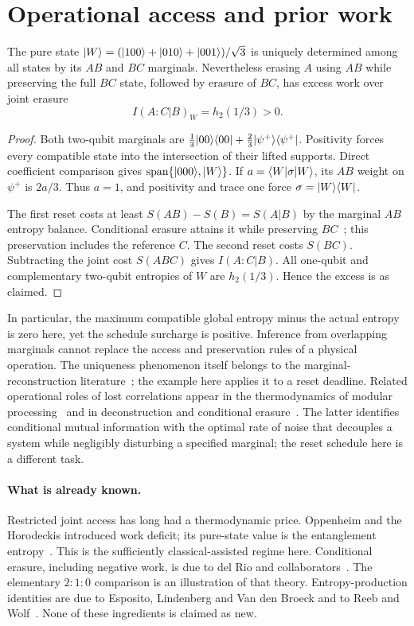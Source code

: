 \section{Operational access and prior work}\label{sec:access}
\begin{proposition}\label{prop:W}
The pure state $|W\rangle=(|100\rangle+|010\rangle+|001\rangle)/\sqrt3$ is uniquely determined among all states by its $AB$ and $BC$ marginals. Nevertheless erasing $A$ using $AB$ while preserving the full $BC$ state, followed by erasure of $BC$, has excess work over joint erasure
\[
 I(A:C|B)_W=h_2(1/3)>0.
\]
\end{proposition}
\begin{proof}
Both two-qubit marginals are $\frac13|00\rangle\langle00|+\frac23|\psi^+\rangle\langle\psi^+|$. Positivity forces every compatible state into the intersection of their lifted supports. Direct coefficient comparison gives $\operatorname{span}\{|000\rangle,|W\rangle\}$. If $a=\langle W|\sigma|W\rangle$, its $AB$ weight on $\psi^+$ is $2a/3$. Thus $a=1$, and positivity and trace one force $\sigma=|W\rangle\langle W|$.

The first reset costs at least $S(AB)-S(B)=S(A|B)$ by the marginal $AB$ entropy balance. Conditional erasure attains it while preserving $BC$~\cite[Corollary 2 and Appendix A]{delrio}; this preservation includes the reference $C$. The second reset costs $S(BC)$. Subtracting the joint cost $S(ABC)$ gives $I(A:C|B)$. All one-qubit and complementary two-qubit entropies of $W$ are $h_2(1/3)$. Hence the excess is as claimed.
\end{proof}

In particular, the maximum compatible global entropy minus the actual entropy is zero here, yet the schedule surcharge is positive. Inference from overlapping marginals cannot replace the access and preservation rules of a physical operation. The uniqueness phenomenon itself belongs to the marginal-reconstruction literature~\cite{lpw}; the example here applies it to a reset deadline. Related operational roles of lost correlations appear in the thermodynamics of modular processing~\cite{modularity} and in deconstruction and conditional erasure~\cite{conditionaldecoupling,deconstruction}. The latter identifies conditional mutual information with the optimal rate of noise that decouples a system while negligibly disturbing a specified marginal; the reset schedule here is a different task.

\paragraph{What is already known.}
Restricted joint access has long had a thermodynamic price. Oppenheim and the Horodeckis introduced work deficit; its pure-state value is the entanglement entropy~\cite{deficit}. This is the sufficiently classical-assisted regime here. Conditional erasure, including negative work, is due to del Rio and collaborators~\cite{delrio}. The elementary $2:1:0$ comparison is an illustration of that theory. Entropy-production identities are due to Esposito, Lindenberg and Van den Broeck and to Reeb and Wolf~\cite{esposito,reebwolf}. None of these ingredients is claimed as new.

